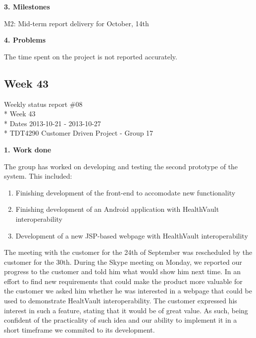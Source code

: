 \textbf{3. Milestones}

M2: Mid-term report delivery for October, 14th

\textbf{4. Problems}

The time spent on the project is not reported accurately.


\newpage
\subsection{Week 43}

\begin{center}
Weekly status report \#08\\*
Week 43 \\*
Dates 2013-10-21 - 2013-10-27 \\*
TDT4290 Customer Driven Project - Group 17
\end{center}

\textbf{1. Work done}

The group has worked on developing and testing the second prototype of the system.
This included:

\begin{enumerate}
\item Finishing development of the front-end to accomodate new functionality
\item Finishing development of an Android application with HealthVault interoperability
\item Development of a new JSP-based webpage with HealthVault interoperability
\end{enumerate}

The meeting with the customer for the 24th of September was rescheduled by the customer for the 30th. 
During the Skype meeting on Monday, we reported our progress to the customer and told him what would show him next time. 
In an effort to find new requirements that could make the product more valuable for the customer we asked him whether he was interested in a webpage that could be used to demonstrate HealtVault interoperability.
The customer expressed his interest in such a feature, stating that it would be of great value.
As such, being confident of the practicality of such idea and our ability to implement it in a short timeframe we commited to its development. 


